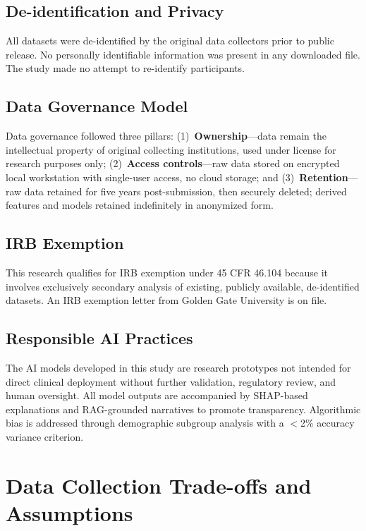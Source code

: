 \subsection{De-identification and Privacy}

All datasets were de-identified by the original data collectors prior to public release. No personally identifiable information was present in any downloaded file. The study made no attempt to re-identify participants.

\subsection{Data Governance Model}

Data governance followed three pillars: (1)~\textbf{Ownership}---data remain the intellectual property of original collecting institutions, used under license for research purposes only; (2)~\textbf{Access controls}---raw data stored on encrypted local workstation with single-user access, no cloud storage; and (3)~\textbf{Retention}---raw data retained for five years post-submission, then securely deleted; derived features and models retained indefinitely in anonymized form.

\subsection{IRB Exemption}

This research qualifies for IRB exemption under 45 CFR 46.104 because it involves exclusively secondary analysis of existing, publicly available, de-identified datasets. An IRB exemption letter from Golden Gate University is on file.

\subsection{Responsible AI Practices}

The AI models developed in this study are research prototypes not intended for direct clinical deployment without further validation, regulatory review, and human oversight. All model outputs are accompanied by SHAP-based explanations and RAG-grounded narratives to promote transparency. Algorithmic bias is addressed through demographic subgroup analysis with a $<$2\% accuracy variance criterion.

\section{Data Collection Trade-offs and Assumptions}
\label{sec:data_tradeoffs}

